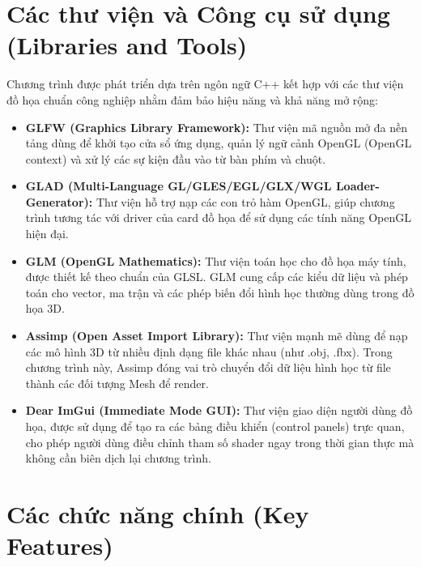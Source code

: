 \section{Các thư viện và Công cụ sử dụng (Libraries and Tools)}

Chương trình được phát triển dựa trên ngôn ngữ C++ kết hợp với các thư viện đồ họa chuẩn công nghiệp nhằm đảm bảo hiệu năng và khả năng mở rộng:

\begin{itemize}
	\item \textbf{GLFW (Graphics Library Framework):} Thư viện mã nguồn mở đa nền tảng dùng để khởi tạo cửa sổ ứng dụng, quản lý ngữ cảnh OpenGL (OpenGL context) và xử lý các sự kiện đầu vào từ bàn phím và chuột.
	
	\item \textbf{GLAD (Multi-Language GL/GLES/EGL/GLX/WGL Loader-Generator):} Thư viện hỗ trợ nạp các con trỏ hàm OpenGL, giúp chương trình tương tác với driver của card đồ họa để sử dụng các tính năng OpenGL hiện đại.
	
	\item \textbf{GLM (OpenGL Mathematics):} Thư viện toán học cho đồ họa máy tính, được thiết kế theo chuẩn của GLSL. GLM cung cấp các kiểu dữ liệu và phép toán cho vector, ma trận và các phép biến đổi hình học thường dùng trong đồ họa 3D.
	
	\item \textbf{Assimp (Open Asset Import Library):} Thư viện mạnh mẽ dùng để nạp các mô hình 3D từ nhiều định dạng file khác nhau (như .obj, .fbx). Trong chương trình này, Assimp đóng vai trò chuyển đổi dữ liệu hình học từ file thành các đối tượng Mesh để render.
	
	\item \textbf{Dear ImGui (Immediate Mode GUI):} Thư viện giao diện người dùng đồ họa, được sử dụng để tạo ra các bảng điều khiển (control panels) trực quan, cho phép người dùng điều chỉnh tham số shader ngay trong thời gian thực mà không cần biên dịch lại chương trình.
\end{itemize}

\section{Các chức năng chính (Key Features)}

